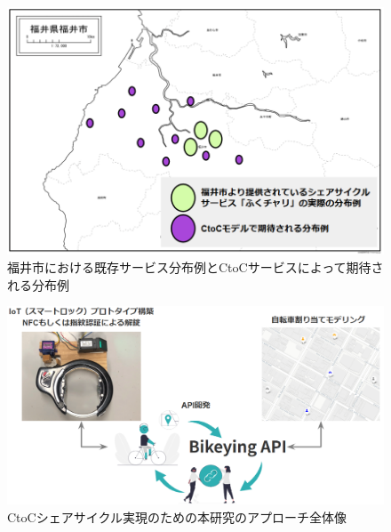       \begin{figure}[htbp]
        \centering
        \includegraphics[scale=0.35]
        {figures/mappingExplain.png}
        \caption{福井市における既存サービス分布例とCtoCサービスによって期待される分布例}
        \label{fig:福井市における既存サービス分布例とCtoCサービスによって期待される分布例}
      \end{figure}

      \begin{figure}[htbp]
        \centering
        \includegraphics[scale=0.58]
        {figures/approach.png}
        \caption{CtoCシェアサイクル実現のための本研究のアプローチ全体像}
        \label{fig:CtoCシェアサイクル実現のための本研究のアプローチ全体像}
      \end{figure}

